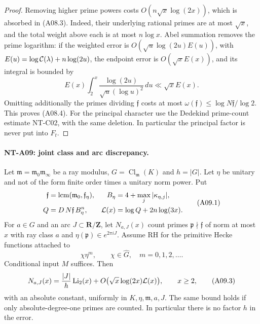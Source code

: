 \begin{proof}
Removing higher prime powers costs \(O(n\sqrt x\log(2x))\),
which is absorbed in (A08.3). Indeed, their underlying rational
primes are at most \(\sqrt x\), and the total weight above
each is at most \(n\log x\).
Abel summation removes the prime logarithm: if the weighted
error is \(O(\sqrt u\log(2u)E(u))\), with
\(E(u)=\log{\cal C}(\lambda)+n\log(2u)\), the endpoint error
is \(O(\sqrt xE(x))\), and its integral is bounded by
\[
 E(x)\int_2^x\frac{\log(2u)}
                     {\sqrt u(\log u)^2}\,du
                       \ll\sqrt x E(x).
 \]
Omitting additionally the primes dividing \(\mathfrak f\)
costs at most \(\omega(\mathfrak f)\le
\log N\mathfrak f/\log2\).
This proves (A08.4). For the principal character use the
Dedekind prime-count estimate NT-C02, with the same deletion.
In particular the principal factor is never put into \(F_t\).
\end{proof}

\paragraph{NT-A09: joint class and arc discrepancy.}
Let \(\mathfrak m=\mathfrak m_0\mathfrak m_\infty\) be a ray
modulus, \(G=\operatorname{Cl}_{\mathfrak m}(K)\) and \(h=|G|\).
Let \(\eta\) be unitary and not of the form finite order times
a unitary norm power. Put
\[
 \begin{aligned}
 \mathfrak f&=\operatorname{lcm}(\mathfrak m_0,\mathfrak f_\eta),
 & B_\eta&=4+\max_j|\kappa_{\eta,j}|,\\
 Q&=D\,N\mathfrak f\,B_\eta^n,
 & {\cal L}(x)&=\log Q+2n\log(3x).
 \end{aligned}                                                     \tag{A09.1}
\]
For \(a\in G\) and an arc \(J\subset\mathbf R/\mathbf Z\), let
\(N_{a,J}(x)\) count primes \(\mathfrak p\nmid\mathfrak f\)
of norm at most \(x\) with ray class \(a\) and
\(\eta(\mathfrak p)\in e^{2\pi iJ}\).
Assume RH for the primitive Hecke functions attached to
\[
             \chi\eta^m,\qquad
     \chi\in\widehat G,\quad m=0,1,2,\ldots .             \tag{A09.2}
\]
Conditional input \(M\) suffices. Then
\[
 N_{a,J}(x)=\frac{|J|}{h}\operatorname{Li}_2(x)
           +O\bigl(\sqrt x\log(2x){\cal L}(x)\bigr),
 \qquad x\ge2,                                         \tag{A09.3}
\]
with an absolute constant, uniformly in \(K,\eta,\mathfrak m,a,J\).
The same bound holds if only absolute-degree-one primes are counted.
In particular there is no factor \(h\) in the error.

